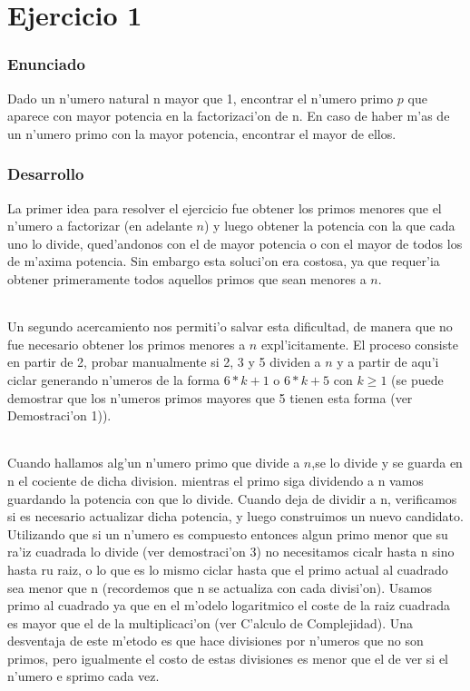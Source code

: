 \part{Ejercicio 1}
\section{Enunciado}
Dado un n'umero natural n mayor que 1, encontrar el n'umero primo $p$ que aparece con mayor potencia en la factorizaci'on 
de n. En caso de haber m'as de un n'umero primo con  la mayor potencia, encontrar el mayor de ellos.

\section{Desarrollo}
La primer idea para resolver el ejercicio fue obtener los primos menores que el n'umero a factorizar
(en adelante $n$) y luego obtener la potencia con la que cada uno lo divide, qued'andonos con el de mayor
potencia o con el mayor de todos los de m'axima potencia. Sin embargo esta soluci'on era costosa, ya que
requer'ia obtener primeramente todos aquellos primos que sean menores a $n$.
\paragraph{}
Un segundo acercamiento nos permiti'o salvar esta dificultad, de manera que no fue necesario obtener 
los primos menores a $n$ expl'icitamente. El proceso consiste en partir de 2, probar manualmente si 2, 3 y 5 
dividen a $n$ y a partir  de aqu'i ciclar generando n'umeros de la forma $6*k + 1$ o $6*k + 5$ con $k \geq 1$ 
(se puede demostrar que los n'umeros primos mayores que 5 tienen esta forma (ver Demostraci'on 1)).
\paragraph{}
Cuando hallamos alg'un n'umero primo que divide a $n$,se lo divide y se guarda en n el cociente de dicha division. mientras el primo siga dividendo a n vamos guardando la potencia con que lo divide. Cuando deja de dividir a n, verificamos si es necesario actualizar dicha potencia, y luego construimos un nuevo candidato. Utilizando que si un n'umero es compuesto entonces algun primo menor que su ra'iz cuadrada lo divide (ver demostraci'on 3) no necesitamos cicalr hasta n sino hasta ru raiz, o lo que es lo mismo ciclar hasta que el primo actual al cuadrado sea menor que n (recordemos que n se actualiza con cada divisi'on). Usamos primo al cuadrado ya que en el m'odelo logaritmico el coste de la raiz cuadrada es mayor que el de la multiplicaci'on (ver C'alculo de Complejidad). Una desventaja de este m'etodo es que hace divisiones por n'umeros que no son primos, pero igualmente el costo de estas divisiones es menor que el de ver si el n'umero e sprimo cada vez.

